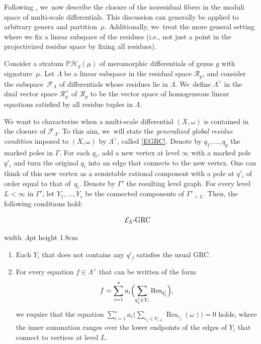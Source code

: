 \documentclass[11pt]{article}
\newcommand{\ie}{i.e.,\xspace}
\newcommand\PP{{\mathbb P}}
\DeclareMathOperator\Res{Res}
\theoremstyle{definition}
\begin{document}
Following \cite[\S 4.1]{CMZ}, we~now describe the closure of the isoresidual fibers in the moduli space of multi-scale differentials. This discussion can generally be applied to arbitrary genera and partition~$\mu$. Additionally, we~treat the more general setting where we fix a linear subspace of the residues (\ie not just a point in the projectivized residue space by fixing all residues).

Consider a stratum $\PP\mathcal H_{g}(\mu)$ of meromorphic differentials of genus $g$ with signature~$\mu$. Let $\Lambda$ be a linear subspace in the residual space $\mathcal{R}_{p}$, and consider the subspace~$\mathcal{F}_{\Lambda}$ of differentials whose residues lie in $\Lambda$. We~define ${\Lambda}^{\vee}$ in the dual vector space $\mathcal{R}_{p}^{\vee}$ of $\mathcal{R}_{p}$ to be the vector space of homogeneous linear equations satisfied by all residue tuples in $\Lambda$.

We want to characterize when a multi-scale differential $(X,\omega)$ is contained in the closure of $\mathcal F_\Lambda$. To this aim, we~will state the {\em generalized global residue condition} imposed to $(X,\omega)$ by $\Lambda^{\vee}$, called \ref{EGRC}.
Denote by $q_1,\ldots, q_p$ the marked poles in $\Gamma$. For each $q_i$, add a new vertex at level $\infty$ with a marked pole $q'_i$
and turn the original $q_i$ into an edge that connects to the new vertex. One can think of this new vertex as a semistable rational component with a pole at $q'_i$ of order equal to that of~$q_i$. Denote by $\Gamma'$ the resulting level graph. For every level $L < \infty$ in $\Gamma'$, let $Y_1,\ldots, Y_s$ be the connected components of $\Gamma'_{>L}$.
Then, the following conditions hold:\vspace*{3pt}

\noindent
\begin{minipage}{.13\textwidth}
\vspace*{-8pt}
\begin{equation}\tag*{$\mathcal{E}_{\Lambda}$-GRC}\label{EGRC}
\end{equation}
\end{minipage}
\vrule width .4pt height 1.8cm\;
\begin{minipage}{.85\textwidth}
\begin{enumerate}
\item\label{EGRC1}
Each $Y_i$ that does not contains any $q'_{j}$ satisfies the usual GRC.

\item\label{EGRC2}
For every equation $f\in \Lambda^{\vee}$ that can be written of the form\vspace*{-5pt}
\[
f = \sum_{i=1}^s a_i \Bigl(\sum_{q'_j\in Y_i} \mathrm{Res}_{q'_j}\Bigr),
\]
we require that the equation
$\sum_{i=1}^s a_i \bigl(\sum_{e_j \in Y_{i, L}} \Res_{e_j} (\omega)\bigr) = 0$
holds, where the inner summation ranges over the lower endpoints of the edges of $Y_i$ that connect to vertices at level $L$.
\end{enumerate}
\end{minipage}
\end{document}
